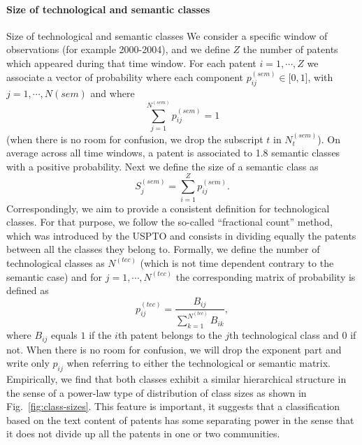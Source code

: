 \paragraph*{Size of technological and semantic classes}{Size of technological and semantic classes}
We consider a specific window of observations (for example 2000-2004), and we define $Z$ the number of patents which appeared during that time window. For each patent $i=1, \cdots, Z$ we associate a vector of probability where each component $p_{ij}^{(sem)} \in \big[ 0,1 \big]$, with  $j = 1, \cdots, N{(sem)}$ and where
$$\displaystyle \sum_{j=1}^{N^{(sem)}} p_{ij}^{(sem)} = 1$$ (when there is no room for confusion, we drop the subscript $t$ in $N_t^{(sem)}$). On average across all time windows, a patent is associated to 1.8 semantic classes with a positive probability. Next we define the size of a semantic class as $$S_j^{(sem)} = \displaystyle \sum_{i=1}^Z p_{ij}^{(sem)}.$$ 
Correspondingly, we aim to provide a consistent definition for technological classes. For that purpose, we follow the so-called ``fractional count'' method, which was introduced by the USPTO and consists in dividing equally the patents between all the classes they belong to. Formally, we define the number of technological classes as
$N^{(tec)}$  (which is not time dependent contrary to the semantic case) and for $j = 1, \cdots, N^{(tec)}$ the corresponding matrix of probability is defined as
\[
 p_{ij}^{(tec)} = \frac{B_{ij}}{\displaystyle \sum_{k=1}^{N^{(tec)}}{B_{ik}}},
\]
where  $B_{ij}$ equals $1$ if the $i$th patent belongs to the $j$th technological class and $0$ if not. When there is no room for confusion, we will drop the exponent part and write only $p_{ij}$ when referring to either the technological or semantic matrix. Empirically, we find that both classes exhibit a similar hierarchical structure in the sense of a power-law type of distribution of class sizes as shown in Fig.~\ref{fig:class-sizes}. This feature is important, it suggests that a classification based on the text content of patents has some separating power in the sense that it does not divide up all the patents in one or two communities. 

